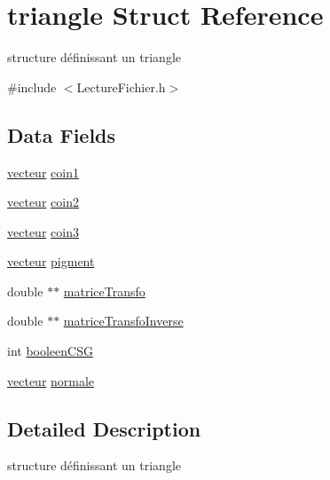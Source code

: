 \hypertarget{structtriangle}{
\section{triangle Struct Reference}
\label{structtriangle}
}


structure définissant un triangle  




{\ttfamily \#include $<$LectureFichier.h$>$}

\subsection*{Data Fields}
\begin{DoxyCompactItemize}
\item 
\hyperlink{structvecteur}{vecteur} \hyperlink{structtriangle_a9cc36100c63d0a9981e9a02f61382478}{coin1}
\item 
\hyperlink{structvecteur}{vecteur} \hyperlink{structtriangle_a423cc79b02a928d7c839c23df7bd96d7}{coin2}
\item 
\hyperlink{structvecteur}{vecteur} \hyperlink{structtriangle_a6b17f7821d0225a2203bbf488d8fe325}{coin3}
\item 
\hyperlink{structvecteur}{vecteur} \hyperlink{structtriangle_a5a4ee24431a1811fa1c8b75844198987}{pigment}
\item 
double $\ast$$\ast$ \hyperlink{structtriangle_aa06ccc348007e3355beccf412f2f656c}{matriceTransfo}
\item 
double $\ast$$\ast$ \hyperlink{structtriangle_acd7a3590501dcccfaefccbb658f83821}{matriceTransfoInverse}
\item 
int \hyperlink{structtriangle_a4428e32d4383f7dee25e5a4cb192da24}{booleenCSG}
\item 
\hyperlink{structvecteur}{vecteur} \hyperlink{structtriangle_a944738f40a0294270a0047acc5a77ee2}{normale}
\end{DoxyCompactItemize}


\subsection{Detailed Description}
structure définissant un triangle 

